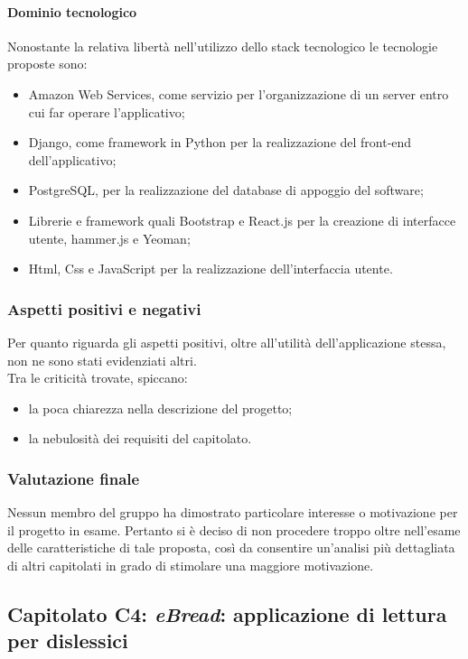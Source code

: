 			\paragraph{Dominio tecnologico}
			Nonostante la relativa libertà nell'utilizzo dello stack tecnologico le tecnologie proposte sono:
			\begin{itemize}
				\item Amazon Web Services, come servizio per l'organizzazione di un server entro cui far operare l'applicativo;
				\item Django, come framework in Python per la realizzazione del front-end dell'applicativo;
				\item PostgreSQL, per la realizzazione del database di appoggio del software;
				\item Librerie e framework quali Bootstrap e React.js per la creazione di interfacce utente, hammer.js e Yeoman;
				\item Html, Css e JavaScript per la realizzazione dell'interfaccia utente.
			\end{itemize}
		\subsubsection{Aspetti positivi e negativi}
		Per quanto riguarda gli aspetti positivi, oltre all'utilità dell'applicazione stessa, non ne sono stati evidenziati altri.
		\\Tra le criticità trovate, spiccano:
		\begin{itemize}
			\item la poca chiarezza nella descrizione del progetto;
			\item la nebulosità dei requisiti del capitolato.
		\end{itemize}
		\subsubsection{Valutazione finale}
		Nessun membro del gruppo ha dimostrato particolare interesse o motivazione per il progetto in esame. Pertanto si è deciso di non procedere 
		troppo oltre nell'esame delle caratteristiche di tale proposta, così da consentire un'analisi più dettagliata di altri capitolati in grado 
		di stimolare una maggiore motivazione.
		
	\subsection{Capitolato C4: \emph{eBread}: applicazione di lettura per dislessici}
